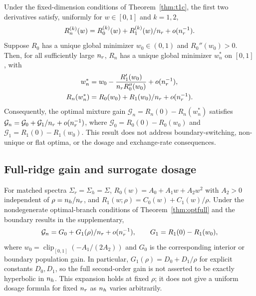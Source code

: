 \begin{theorem}\label{thm:optfull}
Under the fixed-dimension conditions of Theorem~\ref{thm:t1c}, the first two derivatives satisfy, uniformly for $w\in[0,1]$ and $k=1,2$,
\begin{equation}
 R_n^{(k)}(w)=R_0^{(k)}(w)+R_1^{(k)}(w)/n_r+o(n_r^{-1}).
 \label{eq:fullderivative-main}
\end{equation}
Suppose $R_0$ has a unique global minimizer $w_0\in(0,1)$ and $R_0''(w_0)>0$. Then, for all sufficiently large $n_r$, $R_n$ has a unique global minimizer $w_n^*$ on $[0,1]$, with
\begin{align}
 w_n^*&=w_0-\frac{R_1'(w_0)}{n_r R_0''(w_0)}+o(n_r^{-1}),\notag\\
 R_n(w_n^*)&=R_0(w_0)+R_1(w_0)/n_r+o(n_r^{-1}).
 \label{eq:optfull-main}
\end{align}
Consequently, the optimal mixture gain $\mathcal G_n=R_n(0)-R_n(w_n^*)$ satisfies
$\mathcal G_n=\mathcal G_0+\mathcal G_1/n_r+o(n_r^{-1})$, where
$\mathcal G_0=R_0(0)-R_0(w_0)$ and $\mathcal G_1=R_1(0)-R_1(w_0)$.
This result does not address boundary-switching, non-unique or flat optima, or the dosage and exchange-rate consequences.
\end{theorem}

\subsection{Full-ridge gain and surrogate dosage}

\begin{theorem}\label{thm:fulldose}
For matched spectra $\Sigma_r=\Sigma_h=\Sigma$, $R_0(w)=A_0+A_1w+A_2w^2$ with $A_2>0$ independent of $\rho=n_h/n_r$, and $R_1(w;\rho)=C_0(w)+C_1(w)/\rho$. Under the nondegenerate optimal-branch conditions of Theorem~\ref{thm:optfull} and the boundary results in the supplementary,
\begin{equation}
 \mathcal G_n=G_0+G_1(\rho)/n_r+o(n_r^{-1}),
 \qquad G_1=R_1(0)-R_1(w_0),
 \label{eq:fulldose-main}
\end{equation}
where $w_0=\operatorname{clip}_{[0,1]}(-A_1/(2A_2))$ and $G_0$ is the corresponding interior or boundary population gain. In particular, $G_1(\rho)=D_0+D_1/\rho$ for explicit constants $D_0,D_1$, so the full second-order gain is not asserted to be exactly hyperbolic in $n_h$.
This expansion holds at fixed $\rho$; it does not give a uniform dosage formula for fixed $n_r$ as $n_h$ varies arbitrarily.
\end{theorem}

